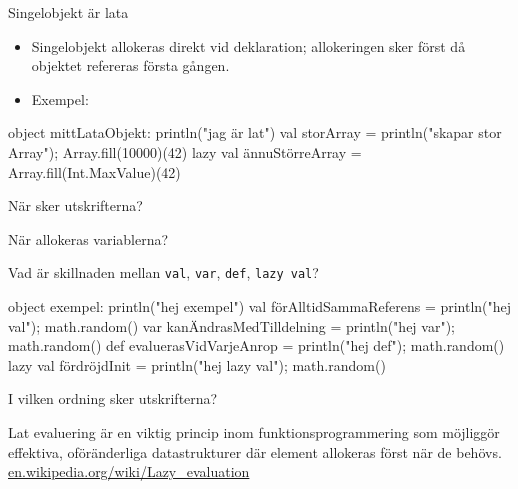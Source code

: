 \begin{Slide}{Singelobjekt är lata}

\begin{itemize}
  \item Singelobjekt allokeras  direkt vid deklaration; allokeringen sker först då objektet refereras första gången.

\pause

  \item Exempel:

\end{itemize}

\begin{Code}[basicstyle=\ttfamily\fontsize{7.4}{11}\selectfont]
object mittLataObjekt:
  println("jag är lat")
  val storArray = { println("skapar stor Array"); Array.fill(10000)(42) }
  lazy val ännuStörreArray = Array.fill(Int.MaxValue)(42)
\end{Code}

När sker utskrifterna?

När allokeras variablerna?

\end{Slide}




\begin{Slide}{Vad är skillnaden mellan \texttt{val}, \texttt{var}, \texttt{def}, \texttt{lazy val}?}
\begin{Code}[basicstyle=\ttfamily\fontsize{8}{11}\selectfont]
object exempel:
  println("hej exempel")
  val förAlltidSammaReferens  = {println("hej val"); math.random()}
  var kanÄndrasMedTilldelning = {println("hej var"); math.random()}
  def evaluerasVidVarjeAnrop  = {println("hej def"); math.random()}
  lazy val fördröjdInit = {println("hej lazy val"); math.random()}
\end{Code}
I vilken ordning sker utskrifterna?


\pause
{\vspace{2em}\SlideFontTiny Lat evaluering är en viktig princip inom funktionsprogrammering som möjliggör effektiva, oföränderliga datastrukturer där element allokeras först när de behövs. \\
\href{https://en.wikipedia.org/wiki/Lazy_evaluation}{en.wikipedia.org/wiki/Lazy\_evaluation}
}
\end{Slide}

